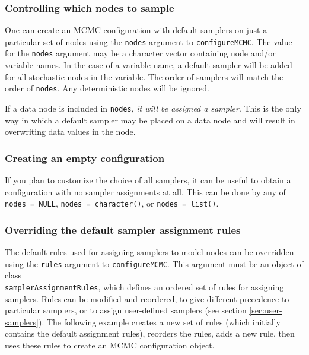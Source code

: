 \documentclass[12pt,oneside]{book}\usepackage[]{graphicx}\usepackage[]{color}
\def\cd#1{\texttt{#1}}
\begin{document}
\subsubsection{Controlling which nodes to sample}

One can create an MCMC configuration with default samplers on just a particular set of nodes using the \cd{nodes} argument to \cd{configureMCMC}. The value for the \cd{nodes} argument may be a character vector containing node and/or variable names.  In the case of a variable name, a default sampler will be added for all stochastic nodes in the variable.  The order of samplers will match the order of \cd{nodes}.  Any deterministic nodes will be ignored.

If a data node is included in \cd{nodes}, \emph{it will be assigned a sampler}.  This is the only way in which a default sampler may be placed on a data node and will result in overwriting data values in the node.

\subsubsection{Creating an empty configuration} 
If you plan to customize the choice of all samplers, it can be useful to obtain a configuration with no sampler assignments at all.  This can be done by any of \cd{nodes = NULL}, \cd{nodes = character()}, or \cd{nodes = list()}. 

\subsubsection{Overriding the default sampler assignment rules}
The default rules used for assigning samplers to model nodes can be overridden using the \cd{rules} argument to \cd{configureMCMC}.  This argument must be an object of class \\
\cd{samplerAssignmentRules}, which defines an ordered set of rules for assigning samplers.  Rules can be modified and reordered, to give different precedence to particular samplers, or to assign user-defined samplers (see section \ref{sec:user-samplers}).  The following example creates a new set of rules (which initially contains the default assignment rules), reorders the rules, adds a new rule, then uses these rules to create an MCMC configuration object.
\end{document}
